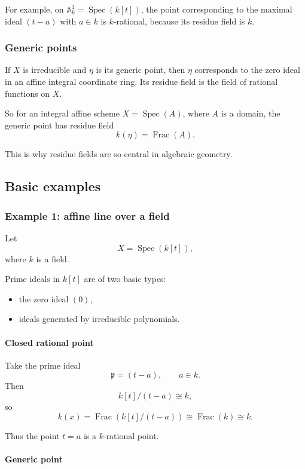 \documentclass[12pt,a4paper]{article}
\theoremstyle{notespace}
\newcommand{\Spec}{\operatorname{Spec}}
\newcommand{\Frac}{\operatorname{Frac}}
\newcommand{\A}{\mathbb A}
\newcommand{\p}{\mathfrak p}
\theoremstyle{definition}
\begin{document}
For example, on \(\A^1_k=\Spec(k[t])\), the point corresponding to the maximal ideal \((t-a)\) with \(a\in k\) is \(k\)-rational, because its residue field is \(k\).

\subsubsection{Generic points}

If \(X\) is irreducible and \(\eta\) is its generic point, then \(\eta\) corresponds to the zero ideal in an affine integral coordinate ring.  
Its residue field is the field of rational functions on \(X\).

So for an integral affine scheme \(X=\Spec(A)\), where \(A\) is a domain, the generic point has residue field
\[
k(\eta)=\Frac(A).
\]

This is why residue fields are so central in algebraic geometry.

\subsection{Basic examples}

\subsubsection{Example 1: affine line over a field}

Let
\[
X=\Spec(k[t]),
\]
where \(k\) is a field.

Prime ideals in \(k[t]\) are of two basic types:

\begin{itemize}[leftmargin=2em]
	\item the zero ideal \((0)\),
	\item ideals generated by irreducible polynomials.
\end{itemize}

\paragraph{Closed rational point}

Take the prime ideal
\[
\p=(t-a),\qquad a\in k.
\]
Then
\[
k[t]/(t-a)\cong k,
\]
so
\[
k(x)=\Frac(k[t]/(t-a))\cong \Frac(k)\cong k.
\]

Thus the point \(t=a\) is a \(k\)-rational point.

\paragraph{Generic point}
\end{document}
